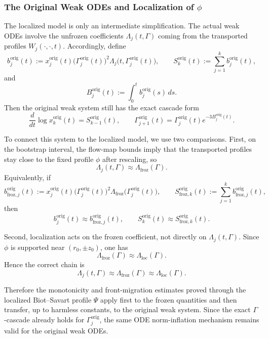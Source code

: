 \documentclass[reqno,11pt]{amsart}
\begin{document}
\subsubsection{The Original Weak ODEs and Localization of $\phi$}
\label{local_phi_final}

The localized model is only an intermediate simplification. The actual weak ODEs involve the unfrozen coefficients $\Lambda_j(t,\Gamma)$ coming from the transported profiles $W_j(\cdot,\cdot,t)$. Accordingly, define
\[
    b_j^{\mathrm{orig}}(t)
    :=
    x_j^{\mathrm{orig}}(t)\bigl(\Gamma_j^{\mathrm{orig}}(t)\bigr)^2
    \Lambda_j\!\bigl(t,\Gamma_j^{\mathrm{orig}}(t)\bigr),
    \qquad
    S_k^{\mathrm{orig}}(t):=\sum_{j=1}^k b_j^{\mathrm{orig}}(t),
\]
and
\[
    B_j^{\mathrm{orig}}(t):=\int_0^t b_j^{\mathrm{orig}}(s)\,ds.
\]
Then the original weak system still has the exact cascade form
\[
    \frac{d}{dt}\log x_k^{\mathrm{orig}}(t)=S_{k-1}^{\mathrm{orig}}(t),
    \qquad
    \Gamma_{j+1}^{\mathrm{orig}}(t)
    =
    \Gamma_j^{\mathrm{orig}}(t)e^{-3B_j^{\mathrm{orig}}(t)}.
\]

To connect this system to the localized model, we use two comparisons. First, on the bootstrap interval, the flow-map bounds imply that the transported profiles stay close to the fixed profile $\phi$ after rescaling, so
\[
    \Lambda_j(t,\Gamma)\approx \Lambda_{\mathrm{froz}}(\Gamma).
\]
Equivalently, if
\[
    b_{\mathrm{froz},j}^{\mathrm{orig}}(t)
    :=
    x_j^{\mathrm{orig}}(t)\bigl(\Gamma_j^{\mathrm{orig}}(t)\bigr)^2
    \Lambda_{\mathrm{froz}}\!\bigl(\Gamma_j^{\mathrm{orig}}(t)\bigr),
    \qquad
    S_{\mathrm{froz},k}^{\mathrm{orig}}(t):=\sum_{j=1}^k b_{\mathrm{froz},j}^{\mathrm{orig}}(t),
\]
then
\[
    b_j^{\mathrm{orig}}(t)\approx b_{\mathrm{froz},j}^{\mathrm{orig}}(t),
    \qquad
    S_k^{\mathrm{orig}}(t)\approx S_{\mathrm{froz},k}^{\mathrm{orig}}(t).
\]

Second, localization acts on the frozen coefficient, not directly on $\Lambda_j(t,\Gamma)$. Since $\phi$ is supported near $(r_0,\pm z_{0})$, one has 
\[
    \Lambda_{\mathrm{froz}}(\Gamma)\approx \Lambda_{\mathrm{loc}}(\Gamma).
\]
Hence the correct chain is
\[
    \Lambda_j(t,\Gamma)\approx \Lambda_{\mathrm{froz}}(\Gamma)\approx \Lambda_{\mathrm{loc}}(\Gamma).
\]

Therefore the monotonicity and front-migration estimates proved through the localized Biot--Savart profile $\Psi$ apply first to the frozen quantities and then transfer, up to harmless constants, to the original weak system. Since the exact $\Gamma$-cascade already holds for $\Gamma_j^{\mathrm{orig}}$, the same ODE norm-inflation mechanism remains valid for the original weak ODEs.
\end{document}

